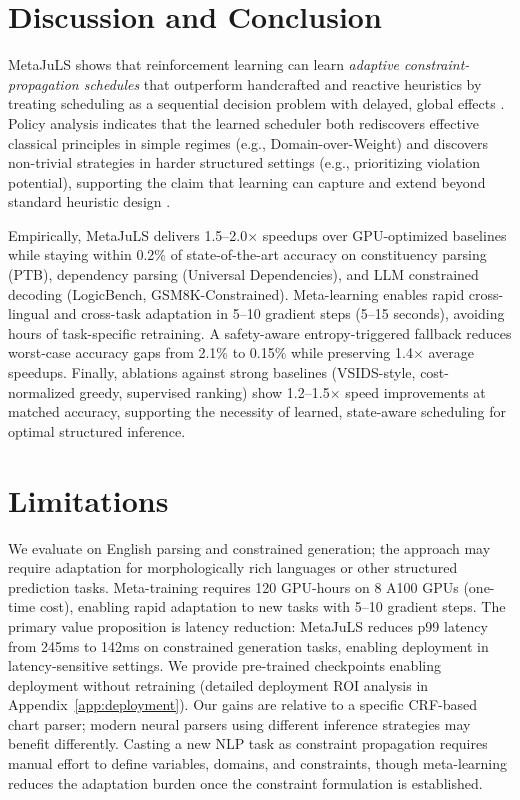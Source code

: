 \documentclass[11pt]{article}
\begin{document}
\section{Discussion and Conclusion}

MetaJuLS shows that reinforcement learning can learn \emph{adaptive constraint-propagation schedules} that outperform handcrafted and reactive heuristics by treating scheduling as a sequential decision problem with delayed, global effects \citep{silver2016alphago,silver2017alphago,schulman2017proximal,sutton2018reinforcement,bessiere2006constraint,debruyne1997optimal,shihab2025detecting}. Policy analysis indicates that the learned scheduler both rediscovers effective classical principles in simple regimes (e.g., Domain-over-Weight) and discovers non-trivial strategies in harder structured settings (e.g., prioritizing violation potential), supporting the claim that learning can capture and extend beyond standard heuristic design \citep{apt2003principles,marriott1998programming,regin1994filtering,gent2006watched}.

Empirically, MetaJuLS delivers 1.5--2.0$\times$ speedups over GPU-optimized baselines while staying within 0.2\% of state-of-the-art accuracy on constituency parsing (PTB), dependency parsing (Universal Dependencies), and LLM constrained decoding (LogicBench, GSM8K-Constrained). Meta-learning enables rapid cross-lingual and cross-task adaptation in 5--10 gradient steps (5--15 seconds), avoiding hours of task-specific retraining. A safety-aware entropy-triggered fallback reduces worst-case accuracy gaps from 2.1\% to 0.15\% while preserving 1.4$\times$ average speedups. Finally, ablations against strong baselines (VSIDS-style, cost-normalized greedy, supervised ranking) show 1.2--1.5$\times$ speed improvements at matched accuracy, supporting the necessity of learned, state-aware scheduling for optimal structured inference.

\section{Limitations}

We evaluate on English parsing and constrained generation; the approach may require adaptation for morphologically rich languages or other structured prediction tasks. Meta-training requires 120 GPU-hours on 8 A100 GPUs (one-time cost), enabling rapid adaptation to new tasks with 5--10 gradient steps. The primary value proposition is latency reduction: MetaJuLS reduces p99 latency from 245ms to 142ms on constrained generation tasks, enabling deployment in latency-sensitive settings. We provide pre-trained checkpoints enabling deployment without retraining (detailed deployment ROI analysis in Appendix~\ref{app:deployment}). Our gains are relative to a specific CRF-based chart parser; modern neural parsers using different inference strategies may benefit differently. Casting a new NLP task as constraint propagation requires manual effort to define variables, domains, and constraints, though meta-learning reduces the adaptation burden once the constraint formulation is established.
\end{document}
